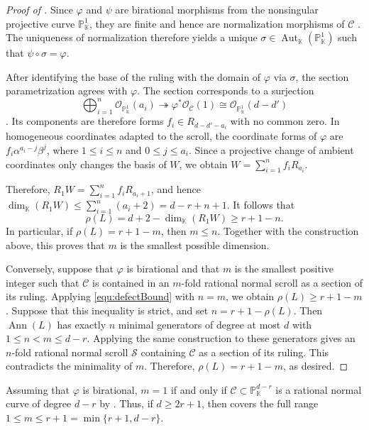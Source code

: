 \documentclass[a4paper, 11pt]{amsart}
\numberwithin{theorem}{section}
\theoremstyle{definition}
\numberwithin{equation}{section}
\DeclareMathOperator{\Ann}{\operatorname{Ann}}
\begin{document}
\begin{proof}[Proof of ]
Since $\varphi$ and $\psi$ are birational morphisms from the nonsingular projective curve $\mathbb{P}^1_{\mathbb{K}}$, they are finite and hence are normalization morphisms of $\mathcal{C}$ \cite[Chapter II, Proposition~6.8 and Exercise~3.8]{hartshorne}.
The uniqueness of normalization therefore yields a unique $\sigma\in\operatorname{Aut}_{\mathbb{K}}(\mathbb{P}^1_{\mathbb{K}})$ such that $\psi\circ\sigma=\varphi$.

After identifying the base of the ruling with the domain of $\varphi$ via $\sigma$, the section parametrization agrees with $\varphi$.
The section corresponds to a surjection
\[
\bigoplus_{i=1}^n
\mathcal O_{\mathbb{P}_{\mathbb K}^1}(a_i)
\twoheadrightarrow
\varphi^*\mathcal O_{\mathcal C}(1)
\cong
\mathcal O_{\mathbb{P}_{\mathbb K}^1}(d-d')
\]
\cite[Chapter II, Proposition~7.12]{hartshorne}.
Its components are therefore forms $f_i\in R_{d-d'-a_i}$ with no common zero.
In homogeneous coordinates adapted to the scroll, the coordinate forms of $\varphi$ are $f_i\alpha^{a_i-j}\beta^j$, where $1\le i\le n$ and $0\le j\le a_i$.
Since a projective change of ambient coordinates only changes the basis of $W$, we obtain $W=\sum_{i=1}^n f_iR_{a_i}$.

Therefore, $R_1W=\sum_{i=1}^n f_iR_{a_i+1}$, and hence $\dim_{\mathbb{K}}(R_1W)\leq\sum_{i=1}^n(a_i+2)=d-r+n+1$.
It follows that 
\begin{equation}\label{equ:defectBound}
\rho(L)=d+2-\dim_{\mathbb{K}}(R_1W)\geq r+1-n.
\end{equation}
In particular, if $\rho(L)=r+1-m$, then $m\leq n$.
Together with the construction above, this proves that $m$ is the smallest possible dimension.

Conversely, suppose that $\varphi$ is birational and that $m$ is the smallest positive integer such that $\mathcal{C}$ is contained in an $m$-fold rational normal scroll as a section of its ruling.
Applying \eqref{equ:defectBound} with $n=m$, we obtain $\rho(L)\geq r+1-m$.
Suppose that this inequality is strict, and set $n=r+1-\rho(L)$.
Then $\Ann(L)$ has exactly $n$ minimal generators of degree at most $d$ with $1\leq n<m\leq d-r$.
Applying the same construction to these generators gives an $n$-fold rational normal scroll $\mathcal{S}$ containing $\mathcal{C}$ as a section of its ruling.
This contradicts the minimality of $m$.
Therefore, $\rho(L)=r+1-m$, as desired.
\end{proof}
Assuming that $\varphi$ is birational, $m = 1$ if and only if $\mathcal{C}\subset \mathbb{P}_{\mathbb{K}}^{d-r}$ is a rational normal curve of degree $d-r$ by .
Thus, if $d\geq 2r+1$, then  covers the full range $1\leq m\leq r+1 = \min\{r+1,d-r\}$.
\end{document}
